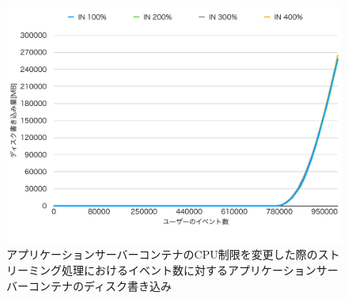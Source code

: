 \documentclass[../../../../../main]{subfiles}
\begin{document}
    \begin{figure}[H]
        \centering
        \includegraphics[width=12cm]{graph}
        \caption{アプリケーションサーバーコンテナのCPU制限を変更した際のストリーミング処理におけるイベント数に対するアプリケーションサーバーコンテナのディスク書き込み}
        \label{fig:stream-change-app-cpu-limit-app-disk-in-app_1024-db_1_1024}
    \end{figure}
\end{document}
